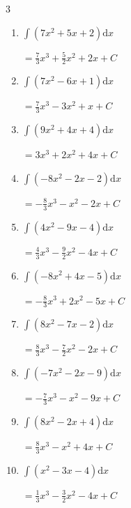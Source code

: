 \newpage
\resetdrill

\begin{multicols}{3}
\begin{enumerate}
  \itemsep=20pt
  \item $\displaystyle \int \left( 7x^{2}+5x+2 \right) \mathrm{d}x$

        $\displaystyle =\frac{7}{3}x^{3}+\frac{5}{2}x^{2}+2x+ C$

  \item $\displaystyle \int \left( 7x^{2}-6x+1 \right) \mathrm{d}x$

        $\displaystyle =\frac{7}{3}x^{3}-3x^{2}+x+ C$

  \item $\displaystyle \int \left( 9x^{2}+4x+4 \right) \mathrm{d}x$

        $\displaystyle =3x^{3}+2x^{2}+4x+ C$

  \item $\displaystyle \int \left( -8x^{2}-2x-2 \right) \mathrm{d}x$

        $\displaystyle =-\frac{8}{3}x^{3}-x^{2}-2x+ C$

  \item $\displaystyle \int \left( 4x^{2}-9x-4 \right) \mathrm{d}x$

        $\displaystyle =\frac{4}{3}x^{3}-\frac{9}{2}x^{2}-4x+ C$

  \item $\displaystyle \int \left( -8x^{2}+4x-5 \right) \mathrm{d}x$

        $\displaystyle =-\frac{8}{3}x^{3}+2x^{2}-5x+ C$

  \item $\displaystyle \int \left( 8x^{2}-7x-2 \right) \mathrm{d}x$

        $\displaystyle =\frac{8}{3}x^{3}-\frac{7}{2}x^{2}-2x+ C$

  \item $\displaystyle \int \left( -7x^{2}-2x-9 \right) \mathrm{d}x$

        $\displaystyle =-\frac{7}{3}x^{3}-x^{2}-9x+ C$

  \item $\displaystyle \int \left( 8x^{2}-2x+4 \right) \mathrm{d}x$

        $\displaystyle =\frac{8}{3}x^{3}-x^{2}+4x+ C$

  \item $\displaystyle \int \left( x^{2}-3x-4 \right) \mathrm{d}x$

        $\displaystyle =\frac{1}{3}x^{3}-\frac{3}{2}x^{2}-4x+ C$


\end{enumerate}
\end{multicols}
